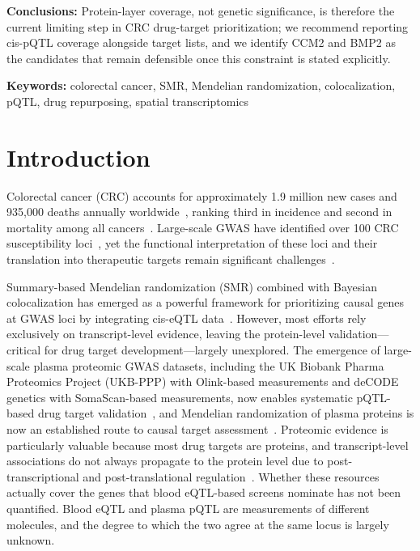 \documentclass[11pt,a4paper]{article}
\begin{document}
\noindent\textbf{Conclusions:} Protein-layer coverage, not genetic
significance, is therefore the current limiting step in CRC drug-target
prioritization; we recommend reporting cis-pQTL coverage alongside target lists,
and we identify CCM2 and BMP2 as the candidates that remain defensible once this
constraint is stated explicitly.

\textbf{Keywords:} colorectal cancer, SMR, Mendelian randomization, colocalization,
pQTL, drug repurposing, spatial transcriptomics

\section{Introduction}

Colorectal cancer (CRC) accounts for approximately 1.9 million new cases and
935,000 deaths annually worldwide~\cite{sung2021global}, ranking third in incidence
and second in mortality among all cancers~\cite{bray2024global, siegel2026colorectal}.  Large-scale GWAS have
identified over 100 CRC susceptibility loci~\cite{huyghe2019discovery,
law2019association, fernandez2023deciphering}, yet the functional interpretation of
these loci and their translation into therapeutic targets remain significant
challenges~\cite{hazelwood2025multi, finan2017druggable, buniello2025opentargets}.

Summary-based Mendelian randomization (SMR) combined with Bayesian
colocalization has emerged as a powerful framework for prioritizing causal
genes at GWAS loci by integrating cis-eQTL data~\cite{zhu2016integration, wu2018integrative,
gusev2016integrative, giambartolomei2014, vosa2021eqtlgen, gtex2020}. However,
most efforts rely exclusively on transcript-level evidence, leaving the
protein-level validation---critical for drug target development---largely
unexplored.
The emergence of large-scale plasma proteomic GWAS datasets, including the UK
Biobank Pharma Proteomics Project (UKB-PPP) with Olink-based measurements and
deCODE genetics with SomaScan-based measurements, now enables systematic
pQTL-based drug target validation~\cite{sun2023plasma, ferkingstad2021large, pietzner2021mapping},
and Mendelian randomization of plasma proteins is now an established route to
causal target assessment~\cite{zheng2020phenome, schmidt2020drugtarget, hemani2018mrbase}.
Proteomic evidence is particularly valuable because most drug targets are
proteins, and transcript-level associations do not always propagate to the
protein level due to post-transcriptional and post-translational
regulation~\cite{vogel2012insights, liu2016impact}.
Whether these resources actually cover the genes that blood eQTL-based screens
nominate has not been quantified. Blood eQTL and plasma pQTL are measurements of
different molecules, and the degree to which the two agree at the same locus is
largely unknown.
\end{document}
